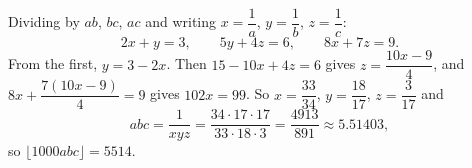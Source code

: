 Dividing by $ab$, $bc$, $ac$ and writing $x=\dfrac1a$, $y=\dfrac1b$, $z=\dfrac1c$:
\[2x+y=3,\qquad5y+4z=6,\qquad8x+7z=9.\]
From the first, $y=3-2x$. Then $15-10x+4z=6$ gives $z=\dfrac{10x-9}4$, and $8x+\dfrac{7(10x-9)}4=9$ gives $102x=99$. So $x=\dfrac{33}{34}$, $y=\dfrac{18}{17}$, $z=\dfrac3{17}$ and
\[abc=\dfrac1{xyz}=\dfrac{34\cdot17\cdot17}{33\cdot18\cdot3}=\dfrac{4913}{891}\approx5.51403,\]
so $\lfloor1000abc\rfloor=\boxed{5514}$.
